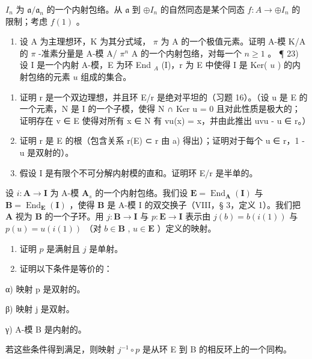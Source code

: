 \(I_{n}\) 为 \(\mathfrak{a}/\mathfrak{a}_{n}\) 的一个内射包络。从 \(\mathfrak{a}\) 到 \(\oplus I_{n}\) 的自然同态是某个同态 \(f: A \to \oplus I_{n}\) 的限制；考虑 \(f(1)\) 。

\begin{enumerate}
\def\labelenumi{\arabic{enumi})}
\setcounter{enumi}{21}
\tightlist
\item
  设 A 为主理想环，K 为其分式域， \(\pi\) 为 A 的一个极值元素。证明 A-模 K/A 的 \(\pi\) -准素分量是 A-模 A/ \(\pi^n\) A 的一个内射包络，对每一个 \(n \geqslant 1\) 。 ¶ 23) 设 I 是一个内射 A-模，E 为环 End \(_A\) (I)，r 为 E 中使得 I 是 Ker( \(u\) ) 的内射包络的元素 \(u\) 组成的集合。
\end{enumerate}

\begin{enumerate}
\def\labelenumi{\alph{enumi})}
\item
  证明 r 是一个双边理想，并且环 E/r 是绝对平坦的（习题 16）。（设 u 是 E 的一个元素，N 是 I 的一个子模，使得 N ∩ Ker u = 0 且对此性质是极大的；证明存在 v ∈ E 使得对所有 x ∈ N 有 vu(x) = x，并由此推出 uvu - u ∈ r。）
\item
  证明 r 是 E 的根（包含关系 r(E) ⊂ r 由 a) 得出）；证明对于每个 u ∈ r，1 - u 是双射的）。
\item
  假设 I 是有限个不可分解内射模的直和。证明环 E/r 是半单的。
\end{enumerate}

设 \(i: \mathbf{A} \to \mathbf{I}\) 为 A-模 \(\mathbf{A}_{s}\) 的一个内射包络。我们设 \(\mathbf{E} = \operatorname{End}_{\mathbf{A}}(\mathbf{I})\) 与 \(\mathbf{B} = \operatorname{End}_{\mathbf{E}}(\mathbf{I})\) ，使得 \(\mathbf{B}\) 是 A-模 I 的双交换子（VIII，§ 3，定义 1）。我们把 \(\mathbf{A}\) 视为 \(\mathbf{B}\) 的一个子环。用 \(j: \mathbf{B} \to \mathbf{I}\) 与 \(p: \mathbf{E} \to \mathbf{I}\) 表示由 \(j(b) = b(i(1))\) 与 \(p(u) = u(i(1))\) （对 \(b \in \mathbf{B}\) , \(u \in \mathbf{E}\) ）定义的映射。

\begin{enumerate}
\def\labelenumi{\alph{enumi})}
\item
  证明 \(p\) 是满射且 \(j\) 是单射。
\item
  证明以下条件是等价的：
\end{enumerate}

α) 映射 p 是双射的。

β) 映射 j 是双射。

γ) A-模 B 是内射的。

若这些条件得到满足，则映射 \(j^{-1} \circ p\) 是从环 E 到 B 的相反环上的一个同构。

